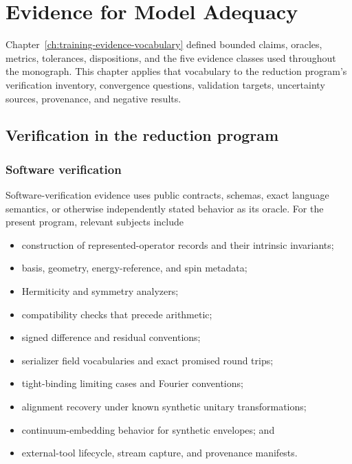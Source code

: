 \chapter{Evidence for Model Adequacy}

\label{ch:evidence-for-model-adequacy}


Chapter~\ref{ch:training-evidence-vocabulary} defined bounded claims,
oracles, metrics, tolerances, dispositions, and the five evidence classes used
throughout the monograph. This chapter applies that vocabulary to the reduction
program's verification inventory, convergence questions, validation targets,
uncertainty sources, provenance, and negative results.

\section{Verification in the reduction program}

\subsection{Software verification}


Software-verification evidence uses public contracts, schemas, exact language
semantics, or otherwise independently stated behavior as its oracle. For the
present program, relevant subjects include

\begin{itemize}
  \item construction of represented-operator records and their intrinsic
    invariants;
  \item basis, geometry, energy-reference, and spin metadata;
  \item Hermiticity and symmetry analyzers;
  \item compatibility checks that precede arithmetic;
  \item signed difference and residual conventions;
  \item serializer field vocabularies and exact promised round trips;
  \item tight-binding limiting cases and Fourier conventions;
  \item alignment recovery under known synthetic unitary transformations;
  \item continuum-embedding behavior for synthetic envelopes; and
  \item external-tool lifecycle, stream capture, and provenance manifests.
\end{itemize}

